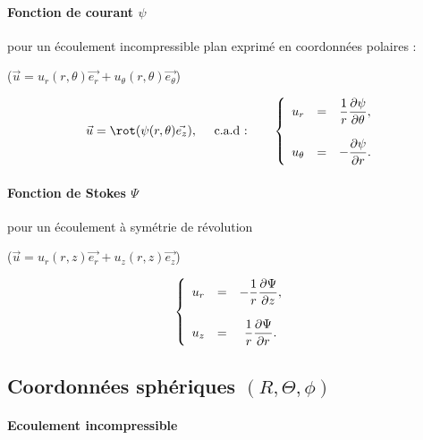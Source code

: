 \paragraph{Fonction de courant $\psi$}  pour un écoulement incompressible plan exprimé en coordonnées polaires :

($\vec{u} = u_r(r,\theta) \vec{e_r} + u_\theta(r,\theta) \vec{e_\theta}$)


\begin{equation}
 \vec{u} = \rot (\psi(r,\theta) \vec{e_z}), 
\quad \mbox{ c.a.d :} \quad \quad 
\left\{
\begin{array}{ccc}
\displaystyle u_r &=& \displaystyle \frac{1}{r}\dpa{\psi}{\theta}, \\ \\
\displaystyle u_\theta &=&  \displaystyle -\dpa{\psi}{r}.
\end{array}
\right.
\end{equation}


\paragraph{Fonction de Stokes $\Psi$}  pour un écoulement à symétrie de révolution

($\vec{u} = u_r(r,z) \vec{e_r} + u_z(r,z) \vec{e_z}$)


\begin{equation}
\left\{
\begin{array}{ccc}
\displaystyle u_r &=& \displaystyle - \frac{1}{r}\frac {\partial \Psi} {\partial z}, \\ \\
\displaystyle u_z &=& \displaystyle  \frac{1}{r}\frac {\partial \Psi} {\partial r}.
\end{array}
\right.
\end{equation}




\clearpage

\subsection{Coordonnées sphériques $(R,\Theta,\phi)$}

\paragraph{Ecoulement incompressible}

